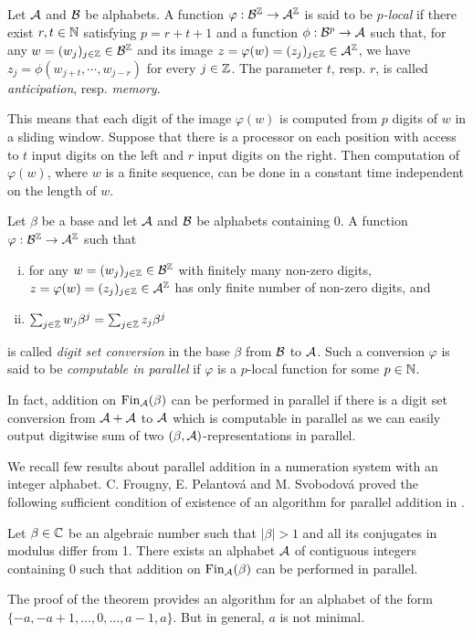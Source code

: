 \begin{upravit}
\begin{defn}
Let $\mathcal{A}$ and $\mathcal{B}$ be alphabets. A function $\varphi:\mathcal{B}^{\mathbb{Z}} \rightarrow \mathcal{A}^{\mathbb{Z}}$ is said to be \emph{$p$-local} if there exist $r,t\in\mathbb{N}$ satisfying $p=r+t+1$ and a function $\phi: \mathcal{B}^p \rightarrow \mathcal{A}$ such that, for any $w=(w_j)_{j\in\mathbb{Z}}\in\mathcal{B}^{\mathbb{Z}}$ and its image $z=\varphi(w)=(z_j)_{j\in\mathbb{Z}}\in\mathcal{A}^{\mathbb{Z}}$, we have $z_j=\phi(w_{j+t},\cdots,w_{j-r})$ for every $j\in\mathbb{Z}$. The parameter $t$, resp. $r$, is called \emph{anticipation}, resp. \emph{memory}.
\end{defn}
This means that each digit of the image $\varphi(w)$ is computed from $p$ digits of $w$ in a sliding window. Suppose that there is a processor on  each position with access to $t$ input digits on the left and $r$ input digits on the right. Then computation of $\varphi(w)$, where $w$ is a finite sequence, can be done in a constant time independent on the length of $w$.
  
\begin{defn}
\label{def:digitSetConversion}
Let $\beta$ be a base and let $\mathcal{A}$ and $\mathcal{B}$ be alphabets containing 0. A function $\varphi:\mathcal{B}^{\mathbb{Z}}\rightarrow \mathcal{A}^{\mathbb{Z}}$ such that
  \begin{enumerate}[i)]
      \item for any $w=(w_j)_{j\in\mathbb{Z}}\in\mathcal{B}^{\mathbb{Z}}$ with finitely many non-zero digits, $z=\varphi(w)=(z_j)_{j\in\mathbb{Z}}\in\mathcal{A}^{\mathbb{Z}}$ has only finite number of non-zero digits, and
      \item $\sum_{j\in\mathbb{Z}} w_j \beta^j= \sum_{j\in\mathbb{Z}} z_j \beta^j$
  \end{enumerate}
  is called \emph{digit set conversion} in the base $\beta$ from $\mathcal{B}$ to $\mathcal{A}$. Such a conversion $\varphi$ is said to be \emph{computable in parallel} if $\varphi$ is a $p$-local function for some $p\in\mathbb{N}$. 
\end{defn}
In fact, addition on $\text{Fin}_{\mathcal{A}}(\beta)$ can be performed in parallel if there is a digit set conversion from $\mathcal{A}+\mathcal{A}$ to $\mathcal{A}$ which is computable in  parallel as we can easily output digitwise sum of two $(\beta,\mathcal{A})$-representations in parallel.   


We recall few results about parallel addition in a numeration system with an integer alphabet. C. Frougny, E. Pelantov\'a and M. Svobodov\'a proved  the following sufficient condition of existence of an algorithm for parallel addition in \cite{parAddNS}.
  \begin{thm}
  \label{thm:suffConjugates}
  Let $\beta\in\mathbb{C}$ be an algebraic number such that $|\beta|>1$ and all its conjugates in modulus differ from 1. There exists an alphabet $\mathcal{A}$ of contiguous integers containing 0 such that addition on $\text{Fin}_{\mathcal{A}}(\beta)$ can be performed in parallel.
  \end{thm}
  The proof of the theorem provides an algorithm for an alphabet of the form $\{-a,-a+1, \dots,0,\dots,a-1,a\}$. But in general, $a$ is not minimal.
    

\end{upravit}

